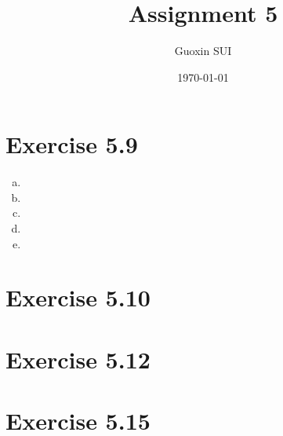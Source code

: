 \documentclass{article}
\title{Assignment 5}
\author{Guoxin SUI}
\date{\today}
\begin{document}
\maketitle

\section{Exercise 5.9}

\begin{enumerate}[(a)]
    \item
    \item
    \item
    \item
    \item

\end{enumerate}

\section{Exercise 5.10}
\section{Exercise 5.12}
\section{Exercise 5.15}
\end{document}
